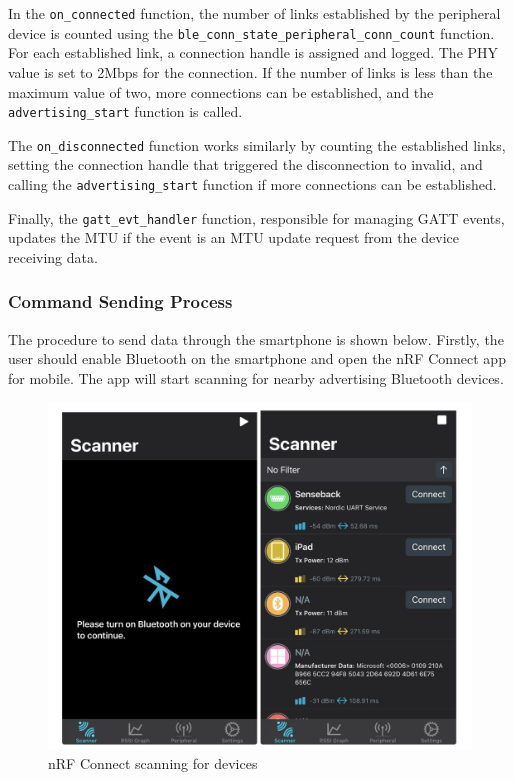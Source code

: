 \documentclass{Configuration_Files/PoliMi3i_thesis}
\begin{document}
In the \texttt{on\_connected} function, the number of links established by the peripheral device is counted using the \texttt{ble\_conn\_state\_peripheral\_conn\_count} function. For each established link, a connection handle is assigned and logged. The PHY value is set to 2Mbps for the connection. If the number of links is less than the maximum value of two, more connections can be established, and the \texttt{advertising\_start} function is called.

The \texttt{on\_disconnected} function works similarly by counting the established links, setting the connection handle that triggered the disconnection to invalid, and calling the \texttt{advertising\_start} function if more connections can be established.

Finally, the \texttt{gatt\_evt\_handler} function, responsible for managing GATT events, updates the MTU if the event is an MTU update request from the device receiving data.

\subsubsection{Command Sending Process}
The procedure to send data through the smartphone is shown below. Firstly, the user should enable Bluetooth on the smartphone and open the nRF Connect app for mobile. The app will start scanning for nearby advertising Bluetooth devices.

\begin{figure}[H]
    \centering
    \includegraphics[scale=0.6]{Multicentral/6.png}
    \caption{nRF Connect scanning for devices}
    \label{multicentral_6}
\end{figure}
\end{document}
